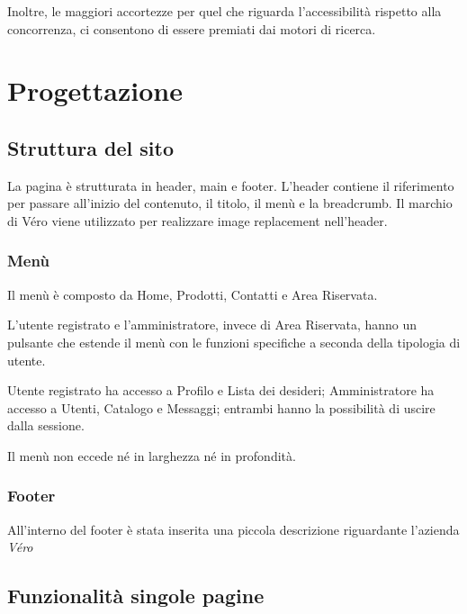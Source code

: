 \documentclass[a4paper, 11pt]{article}
\begin{document}
Inoltre, le maggiori accortezze per quel che riguarda l’accessibilità rispetto alla concorrenza, ci consentono di essere premiati dai motori di ricerca. 


\section{Progettazione}
\subsection{Struttura del sito}

La pagina è strutturata in header, main e footer. L’header contiene il riferimento per passare all’inizio del contenuto, il titolo, il menù e la breadcrumb. Il marchio di Véro viene utilizzato per realizzare image replacement nell'header.

\subsubsection{Menù}
Il menù è composto da Home, Prodotti, Contatti e Area Riservata.

L’utente registrato e l’amministratore, invece di Area Riservata, hanno un pulsante che estende il menù con le funzioni specifiche a seconda della tipologia di utente.

Utente registrato ha accesso a Profilo e Lista dei desideri; Amministratore ha accesso a Utenti, Catalogo e Messaggi; entrambi hanno la possibilità di uscire dalla sessione.

Il menù non eccede né in larghezza né in profondità.

\subsubsection{Footer}
All'interno del footer è stata inserita una piccola descrizione riguardante l'azienda \textit{Véro}

\subsection{Funzionalità singole pagine}
\end{document}
